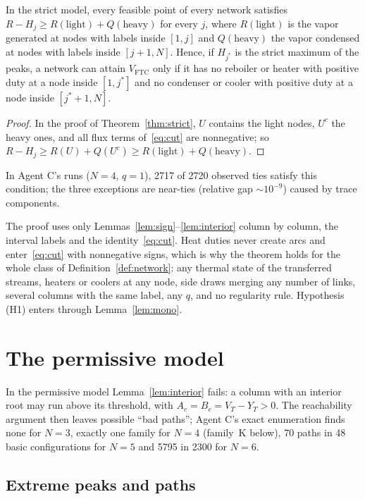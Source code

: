 \documentclass[11pt,a4paper]{report}
\newcommand{\VFTC}{V_{\mathrm{FTC}}}
\begin{document}
\begin{corollary}\label{cor:tie}
In the strict model, every feasible point of every network satisfies $R-H_j\ge R(\text{light})+Q(\text{heavy})$ for every
$j$, where $R(\text{light})$ is the vapor generated at nodes with labels inside $[1,j]$ and $Q(\text{heavy})$ the vapor
condensed at nodes with labels inside $[j+1,N]$. Hence, if $H_{j^*}$ is the strict maximum of the peaks, a network can
attain $\VFTC$ only if it has no reboiler or heater with positive duty at a node inside $[1,j^*]$ and no condenser or
cooler with positive duty at a node inside $[j^*+1,N]$.
\end{corollary}
\begin{proof}
In the proof of Theorem~\ref{thm:strict}, $U$ contains the light nodes, $U^c$ the heavy ones, and all flux terms
of~\eqref{eq:cut} are nonnegative; so $R-H_j\ge R(U)+Q(U^c)\ge R(\text{light})+Q(\text{heavy})$.
\end{proof}
\noindent In Agent C's runs ($N=4$, $q=1$), 2717 of 2720 observed ties satisfy this condition; the three exceptions are
near-ties (relative gap $\sim10^{-9}$) caused by trace components.

\begin{remark}\label{rem:hx}
The proof uses only Lemmas~\ref{lem:sign}--\ref{lem:interior} column by column, the interval labels and the
identity~\eqref{eq:cut}. Heat duties never create arcs and enter~\eqref{eq:cut} with nonnegative signs, which is why
the theorem holds for the whole class of Definition~\ref{def:network}: any thermal state of the transferred streams,
heaters or coolers at any node, side draws merging any number of links, several columns with the same label, any
$q$, and no regularity rule. Hypothesis (H1) enters through Lemma~\ref{lem:mono}.
\end{remark}

\section{The permissive model}

In the permissive model Lemma~\ref{lem:interior} fails: a column with an interior root may run above its threshold,
with $A_c=B_c=V_T-Y_T>0$. The reachability argument then leaves possible ``bad paths''; Agent C's exact enumeration
finds none for $N=3$, exactly one family for $N=4$ (family~K below), 70 paths in 48 basic configurations for $N=5$ and
5795 in 2300 for $N=6$.

\subsection{Extreme peaks and paths}
\end{document}

